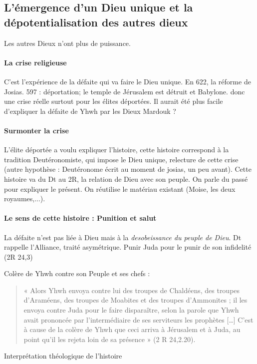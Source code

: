 \subsection{L’émergence d’un Dieu unique et la dépotentialisation des autres dieux}

Les autres Dieux n'ont plus de puissance.
\paragraph{La crise religieuse} C'est l'expérience de la défaite qui va faire le Dieu unique. En 622, la réforme de Josias. 597 : déportation; le temple de Jérusalem est détruit et Babylone. donc une crise réelle surtout pour les élites déportées. Il aurait été plus facile d'expliquer la défaite de Yhwh par les Dieux Mardouk ? 

\paragraph{Surmonter la crise} L'élite déportée a voulu expliquer l'histoire, cette histoire correspond à la tradition Deutéronomiste, qui impose le Dieu unique, relecture de cette crise (autre hypothèse : Deutéronome écrit au moment de josias, un peu avant). Cette histoire va du Dt au 2R, la relation de Dieu avec son peuple. On parle du passé pour expliquer le présent. On réutilise le matériau existant (Moise, les deux royaumes,...).

\paragraph{Le sens de cette histoire : Punition et salut} La défaite n'est pas liée à  Dieu mais à la \textit{desobeissance du peuple de Dieu}. Dt rappelle l'Alliance, traité asymétrique. Punir Juda pour le punir de son infidelité (2R 24,3)

Colère de Yhwh contre son Peuple et ses chefs :
\begin{quote}
    « Alors Yhwh envoya contre lui des troupes de Chaldéens, des troupes d’Araméens, des troupes de
Moabites et des troupes d’Ammonites ; il les envoya contre Juda pour le faire disparaître, selon la
parole que Yhwh avait prononcée par l’intermédiaire de ses serviteurs les prophètes […] C’est à cause
de la colère de Yhwh que ceci arriva à Jérusalem et à Juda, au point qu’il les rejeta loin de sa
présence » (2 R 24,2.20).
\end{quote}

\begin{Synthesis}
Interprétation théologique de l'histoire
\end{Synthesis}


